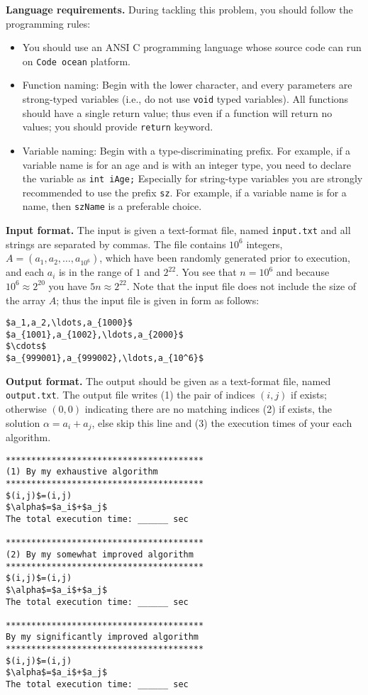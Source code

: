 \documentclass{article}
\begin{document}
\bigskip
\noindent\textbf{Language requirements. }%
During tackling this problem, you should follow the programming rules:
\begin{itemize}
\item You should use an ANSI C programming language whose source code can run on \texttt{Code ocean} platform. 
\item Function naming: Begin with the lower character, and every parameters are strong-typed variables (i.e., do not use \texttt{void} typed variables).
	All functions should have a single return value; thus even if a function will return no values; you should provide \texttt{return} keyword.
\item Variable naming: Begin with a type-discriminating prefix. For example, if a variable name is for an age and is with an integer type,
	you need to declare the variable as \texttt{int iAge;}  Especially for string-type variables you are strongly recommended to use the prefix \texttt{sz}.
	For example, if a variable name is for a name, then \texttt{szName} is a preferable choice.
\end{itemize}

\bigskip
\noindent\textbf{Input format.} %
The input is given a text-format file, named \texttt{input.txt} and all strings are separated by commas.
The file contains $10^6$ integers, $A=(a_1,a_2,\ldots,a_{10^6})$, which have been randomly generated prior to execution, and
each $a_i$ is in the range of $1$ and $2^{22}$. You see that $n=10^6$ and because $10^6\approx 2^{20}$ you have $5n\approx 2^{22}$.
Note that the input file does not include the size of the array $A$; thus the input file is given in form as follows:
\begin{lstlisting}[backgroundcolor=\color{yellow!40}]
$a_1,a_2,\ldots,a_{1000}$
$a_{1001},a_{1002},\ldots,a_{2000}$
$\cdots$
$a_{999001},a_{999002},\ldots,a_{10^6}$
\end{lstlisting}



\bigskip
\noindent\textbf{Output format.} %
The output should be given as a text-format file, named \texttt{output.txt}.
The output file writes (1) the pair of indices $(i,j)$ if exists; otherwise $(0,0)$ indicating there are no matching indices
(2) if exists, the solution $\alpha=a_i+a_j$, else skip this line and (3) the execution times of your each algorithm. 

\begin{lstlisting}[backgroundcolor=\color{yellow!40}]
***************************************
(1) By my exhaustive algorithm
***************************************
$(i,j)$=(i,j)
$\alpha$=$a_i$+$a_j$ 
The total execution time: ______ sec

***************************************
(2) By my somewhat improved algorithm
***************************************
$(i,j)$=(i,j)
$\alpha$=$a_i$+$a_j$ 
The total execution time: ______ sec

***************************************
By my significantly improved algorithm
***************************************
$(i,j)$=(i,j)
$\alpha$=$a_i$+$a_j$ 
The total execution time: ______ sec
\end{lstlisting}
 
\end{document}
